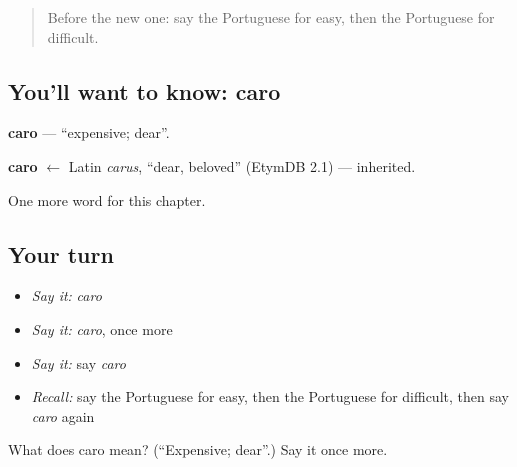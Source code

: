 \begin{quote}
Before the new one: say the Portuguese for easy, then the Portuguese for difficult.
\end{quote}

\subsection*{You'll want to know: caro}
\textbf{caro} — \textquotedblleft{}expensive; dear\textquotedblright{}.

\begin{cousinweb}
\textbf{caro} $\leftarrow$ Latin \emph{carus}, \textquotedblleft{}dear, beloved\textquotedblright{} (EtymDB 2.1) — inherited.
\end{cousinweb}

\begin{grammarlens}[title={What you've built}]
One more word for this chapter.
\end{grammarlens}

\subsection*{Your turn}
\begin{itemize}
\raggedright
  \item \emph{Say it:} \emph{caro}
  \item \emph{Say it:} \emph{caro}, once more
  \item \emph{Say it:} say \emph{caro}
  \item \emph{Recall:} say the Portuguese for easy, then the Portuguese for difficult, then say \emph{caro} again
\end{itemize}

\begin{tcolorbox}[breakable,colback=teal!4,colframe=teal!35!black,title={Before you move on}]
What does caro mean? (\textquotedblleft{}Expensive; dear\textquotedblright{}.) Say it once more.
\end{tcolorbox}
